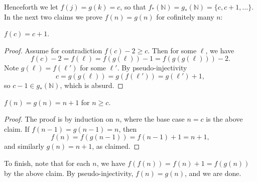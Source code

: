 Henceforth we let $f(j)=g(k)=c$, so that $f_*(\mathbb N)=g_*(\mathbb N)=\{c,c+1,\ldots\}$. In the next two claims we prove $f(n)=g(n)$ for cofinitely many $n$:
\begin{claim}
    $f(c)=c+1$.
\end{claim}
\begin{proof}
    Assume for contradiction $f(c)-2\ge c$. Then for some $\ell$, we have \[f(c)-2=f(\ell)=f(g(\ell))-1=f(g(g(\ell)))-2.\]
    Note $g(\ell)=f(\ell')$ for some $\ell'$. By pseudo-injectivity \[c=g(g(\ell))=g(f(\ell'))=g(\ell')+1,\]
    so $c-1\in g_*(\mathbb N)$, which is absurd.
\end{proof}
\begin{claim}
    $f(n)=g(n)=n+1$ for $n\ge c$.
\end{claim}
\begin{proof}
    The proof is by induction on $n$, where the base case $n=c$ is the above claim. If $f(n-1)=g(n-1)=n$, then \[f(n)=f(g(n-1))=f(n-1)+1=n+1,\]
    and similarly $g(n)=n+1$, as claimed.
\end{proof}

To finish, note that for each $n$, we have $f(f(n))=f(n)+1=f(g(n))$ by the above claim. By pseudo-injectivity, $f(n)=g(n)$, and we are done.
